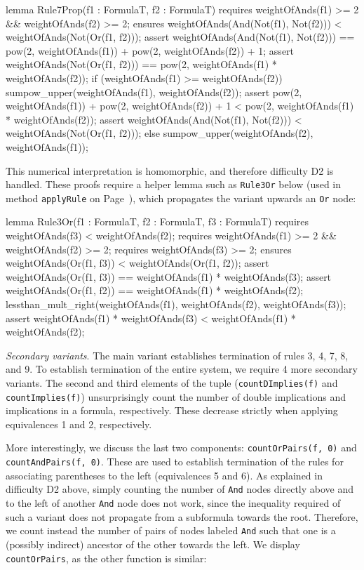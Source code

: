 \begin{dafny}
lemma Rule7Prop(f1 : FormulaT, f2 : FormulaT)
  requires weightOfAnds(f1) >= 2 && weightOfAnds(f2) >= 2;
  ensures weightOfAnds(And(Not(f1), Not(f2))) <
      weightOfAnds(Not(Or(f1, f2)));
{
  assert weightOfAnds(And(Not(f1), Not(f2))) ==
    pow(2, weightOfAnds(f1)) + pow(2, weightOfAnds(f2)) + 1;
  assert weightOfAnds(Not(Or(f1, f2))) ==
    pow(2, weightOfAnds(f1) * weightOfAnds(f2));
  if (weightOfAnds(f1) >= weightOfAnds(f2)) {
    sumpow_upper(weightOfAnds(f1), weightOfAnds(f2));
    assert pow(2, weightOfAnds(f1)) + pow(2, weightOfAnds(f2)) + 1 <
      pow(2, weightOfAnds(f1) * weightOfAnds(f2));
    assert weightOfAnds(And(Not(f1), Not(f2))) 
      < weightOfAnds(Not(Or(f1, f2)));
  } else {
    sumpow_upper(weightOfAnds(f2), weightOfAnds(f1));
  }
}
\end{dafny}

This numerical interpretation is homomorphic, and therefore difficulty
D2 is handled.
These proofs require a helper lemma such as
\texttt{Rule3Or} below (used in method \texttt{applyRule} on
Page~\pageref{method:applyRule}), which propagates the variant upwards
an \texttt{Or} node:

\begin{dafny}
lemma Rule3Or(f1 : FormulaT, f2 : FormulaT, f3 : FormulaT)
  requires weightOfAnds(f3) < weightOfAnds(f2);
  requires weightOfAnds(f1) >= 2 && weightOfAnds(f2) >= 2;
  requires weightOfAnds(f3) >= 2;
  ensures weightOfAnds(Or(f1, f3)) < weightOfAnds(Or(f1, f2));
{
  assert weightOfAnds(Or(f1, f3)) == weightOfAnds(f1) * weightOfAnds(f3);
  assert weightOfAnds(Or(f1, f2)) == weightOfAnds(f1) * weightOfAnds(f2);
  lessthan_mult_right(weightOfAnds(f1),
    weightOfAnds(f2), weightOfAnds(f3));
  assert weightOfAnds(f1) * weightOfAnds(f3) <
    weightOfAnds(f1) * weightOfAnds(f2);
}
\end{dafny}


\emph{Secondary variants}. The main variant establishes termination of
rules 3, 4, 7, 8, and 9. To establish termination of the entire
system, we require 4 more secondary variants. The second and third
elements of the tuple (\texttt{countDImplies(f)} and
\texttt{countImplies(f)}) unsurprisingly count the number of double
implications and implications in a formula, respectively. These
decrease strictly when applying equivalences 1 and 2, respectively.

More interestingly, we discuss the last two components:
\texttt{countOrPairs(f, 0)} and \texttt{countAndPairs(f, 0)}. These
are used to establish termination of the rules for associating
parentheses to the left (equivalences 5 and 6). As explained in
difficulty D2 above, simply counting the number of \texttt{And} nodes
directly above and to the left of another \texttt{And} node does not
work, since the inequality required of such a variant does not
propagate from a subformula towards the root. Therefore, we count
instead the number of pairs of nodes labeled \texttt{And} such that
one is a (possibly indirect) ancestor of the other towards the
left. We display \texttt{countOrPairs}, as the other function is
similar:

